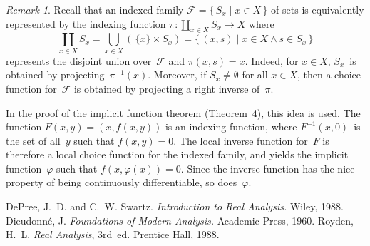 \documentclass[letterpaper,12pt]{article}
\newcommand{\F}{\mathcal{F}}
\newcommand{\bigunion}{\bigcup}
\theoremstyle{plain}
\theoremstyle{definition}
\theoremstyle{remark}
\newtheorem*{rmk}{Remark}
\begin{document}
\begin{rmk}
Recall that an indexed family \(\F=\{\,S_x\mid x\in X\,\}\) of sets is equivalently represented by the indexing function \(\pi:\coprod_{x\in X}S_x\to X\) where
\[\coprod_{x\in X}S_x=\bigunion_{x\in X}(\,\{x\}\times S_x)=\{\,(x,s)\mid x\in X\land s\in S_x\,\}\]
represents the disjoint union over~\(\F\) and \(\pi(x,s)=x\). Indeed, for \(x\in X\), \(S_x\)~is obtained by projecting~\(\pi^{-1}(x)\). Moreover, if \(S_x\ne\emptyset\) for all \(x\in X\), then a choice function for~\(\F\) is obtained by projecting a right inverse of~\(\pi\).

In the proof of the implicit function theorem (Theorem~4), this idea is used. The function \(F(x,y)=(x,f(x,y))\) is an indexing function, where \(F^{-1}(x,0)\)~is the set of all~\(y\) such that \(f(x,y)=0\). The local inverse function for~\(F\) is therefore a local choice function for the indexed family, and yields the implicit function~\(\varphi\) such that \(f(x,\varphi(x))=0\). Since the inverse function has the nice property of being continuously differentiable, so does~\(\varphi\).
\end{rmk}

\begin{thebibliography}{0}
 DePree, J.~D. and C.~W. Swartz. \textit{Introduction to Real Analysis.} Wiley, 1988.
 Dieudonn\'e, J. \textit{Foundations of Modern Analysis.} Academic Press, 1960.
 Royden, H.~L. \textit{Real Analysis}, 3rd~ed. Prentice Hall, 1988.
\end{thebibliography}
\end{document}
